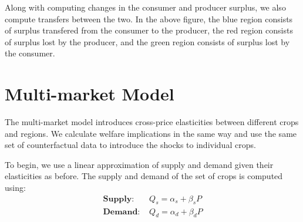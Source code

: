 \documentclass[12pt]{article}
\begin{document}
\begin{figure}

\end{figure}

Along with computing changes in the consumer and producer surplus, we also compute transfers between the two. In the above figure, the blue region consists of surplus transfered from the consumer to the producer, the red region consists of surplus lost by the producer, and the green region consists of surplus lost by the consumer. 


\section{Multi-market Model}	

The multi-market model introduces cross-price elasticities between different crops and regions. We calculate welfare implications in the same way and use the same set of counterfactual data to introduce the shocks to individual crops.

To begin, we use a linear approximation of supply and demand given their elasticities as before. The supply and demand of the set of crops is computed using:
\begin{subequations}
	\begin{align}
	\textbf{Supply: } & Q_{s} = \alpha_{s} + \beta_{s} P 				\\
	\textbf{Demand: } & Q_{d} = \alpha_{d} + \beta_{d} P 	
	\end{align}
\end{subequations}
\end{document}
